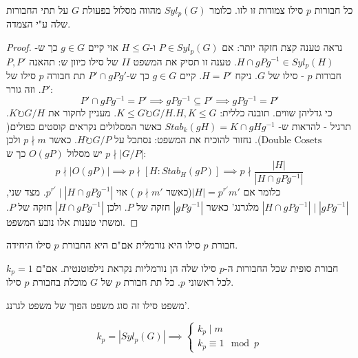 \documentclass{tstextbook}
\begin{document}
\begin{theorem}[סילו 2]
כל חבורות \(p\) סילו צמודות זו לזו. כלומר \(Syl_{p}(G)\) מהווה מסלול בפעולת \(G\) על תתי החבורות שלה ע"י הצמדה.

\end{theorem}
\begin{proof}
נראה טענה קצת חזקה יותר: אם \(P \in Syl_{p}(G)\) ו-\(H\leq G\) אזי קיים \(g \in G\) כך ש-\(H\cap gPg^{-1}\in Syl_{p}(H)\). טענה זו תסיק את המשפט \(II\) של סילו כיוון ש: תהאנה \(P,P'\) חבורות \(p\) - סילו של \(G\). ניקח \(H=P'\). קיים \(g \in  G\) כך ש-\(P'\cap gPg'\) תת חבורה \(p\) סילו של \(P'\). וזה גורר:
$$P'\cap gP g^{-1} =P' \implies gPg^{-1}  \subseteq P' \implies gPg^{-1} =P'$$
כי גדליהן שווים. תובנה כללית: \(H,K\leq G\).\(K\leq G\circlearrowright G / H\). מעניין לחקור את \(K\circlearrowright G / H\). תרגיל - להראות ש- \(Stab_{k}(gH)=K\cap gHg^{-1}\) כאשר המסלולים נקראים קוסטים כפולים(\(\text{Double Cosets}\)). נחזור להוכיח את המשפט: נסתכל על \(H \circlearrowright G / P\). כאשר \(p\nmid m\) ולכן \(p\nmid |G / P|\) יש מסלול \(O(gP)\) כך ש:
$$p\nmid |O(gP)|\implies p\nmid [H:Stab_{H}(gP)]\implies p\nmid \frac{|H|}{|H\cap gPg^{-1} |}$$
כלומר אם \(|H|=p^{r'}m'\)(כאשר \(p\nmid m'\) ) אזי \(p^{r'}\mid|H\cap gPg^{-1} |\). מצד שני, \(|H\cap gPg^{-1} |\mid|gPg^{-1} |\) מלגרנג' כאשר \(|gPg^{-1} |\) חזקה של \(P\). ולכן \(|H\cap gPg^{-1} |\) חזקה של \(P\). ומשתי טענות אלו נובע המשפט.

\end{proof}
\begin{corollary}
חבורת \(p\) סילו היא נורמלית אם"ם היא החבורת \(p\) סילו היחידה.

\end{corollary}
\begin{definition}[נילפוטנטיות]
חבורת סופית שכל החבורות ה-\(p\) סילו שלה הן נורמליות נקראת נילפוטנטית. אם"ם \(k_{p}=1\) לכל ראשוני \(p\). כל תת חבורת \(p\) של \(G\) מוכלת בחבורת \(p\) סילו.

\end{definition}
\begin{remark}
משפט סילו זה סוג משפט הפוך של משפט לגרנג'.

\end{remark}
\begin{theorem}[סילו 3]
$$k_{p}=|Syl_{p}(G)|\implies \begin{cases}k_{p}\mid m \\k_{p} \equiv 1\mod p
\end{cases}$$

\end{theorem}
\end{document}
